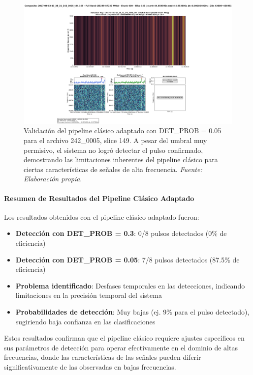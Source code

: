 \begin{figure}[H]
    \centering
    \includegraphics[width=\textwidth]{figures/2017-04-03-13_38_31_242_0005_t44.169_slice149-lowProb.png}
    \caption[ALMA 242\_0005: DET\_PROB 0.05]{Validación del pipeline clásico adaptado con DET\_PROB = 0.05 para el archivo 242\_0005, slice 149. A pesar del umbral muy permisivo, el sistema no logró detectar el pulso confirmado, demostrando las limitaciones inherentes del pipeline clásico para ciertas características de señales de alta frecuencia. \textit{Fuente: Elaboración propia}.}
    \label{fig:242_0005_slice149_lowProb}
\end{figure}

\paragraph{Resumen de Resultados del Pipeline Clásico Adaptado}

Los resultados obtenidos con el pipeline clásico adaptado fueron:

\begin{itemize}
    \item \textbf{Detección con DET\_PROB = 0.3}: 0/8 pulsos detectados (0\% de eficiencia)
    \item \textbf{Detección con DET\_PROB = 0.05}: 7/8 pulsos detectados (87.5\% de eficiencia)
    \item \textbf{Problema identificado}: Desfases temporales en las detecciones, indicando limitaciones en la precisión temporal del sistema
    \item \textbf{Probabilidades de detección}: Muy bajas (ej. 9\% para el pulso detectado), sugiriendo baja confianza en las clasificaciones
\end{itemize}

Estos resultados confirman que el pipeline clásico requiere ajustes específicos en sus parámetros de detección para operar efectivamente en el dominio de altas frecuencias, donde las características de las señales pueden diferir significativamente de las observadas en bajas frecuencias.

